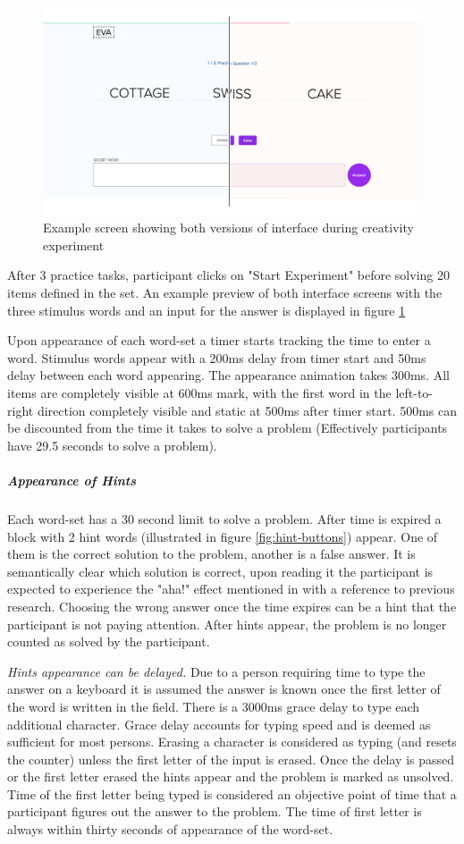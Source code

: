 		\begin{figure}[h]
			\centering
			\includegraphics[width=0.7\linewidth]{graphics/creativity-versions}
			\caption{Example screen showing both versions of interface during creativity experiment}
			\label{fig:creativity-versions}
		\end{figure}
	
		After 3 practice tasks, participant clicks on "Start Experiment" before solving 20 items defined in the set. An example preview of both interface screens with the three stimulus words and an input for the answer is displayed in figure \ref{fig:creativity-versions} 
		
		Upon appearance of each word-set a timer starts tracking the time to enter a word.
		Stimulus words appear with a 200ms delay from timer start and 50ms delay between each word appearing. The appearance animation takes 300ms. All items are completely visible at 600ms mark, with the first word in the left-to-right direction completely visible and static at 500ms after timer start. 500ms can be discounted from the time it takes to solve a problem (Effectively participants have 29.5 seconds to solve a problem).
		
		\subparagraph{Appearance of Hints}
		
		Each word-set has a 30 second limit to solve a problem. After time is expired a block with 2 hint words (illustrated in figure \ref{fig:hint-buttons}) appear. One of them is the correct solution to the problem, another is a false answer. It is semantically clear which solution is correct, upon reading it the participant is expected to experience the "aha!" effect mentioned in \cite[p.634]{Bowden} with a reference to previous research. Choosing the wrong answer once the time expires can be a hint that the participant is not paying attention. After hints appear, the problem is no longer counted as solved by the participant.
		
		\textit{Hints appearance can be delayed.} Due to a person requiring time to type the answer on a keyboard it is assumed the answer is known once the first letter of the word is written in the field. There is a 3000ms grace delay to type each additional character. Grace delay accounts for typing speed and is deemed as sufficient for most persons. Erasing a character is considered as typing (and resets the counter) unless the first letter of the input is erased. Once the delay is passed or the first letter erased the hints appear and the problem is marked as unsolved. Time of the first letter being typed is considered an objective point of time that a participant figures out the answer to the problem. The time of first letter is always within thirty seconds of appearance of the word-set.
		
